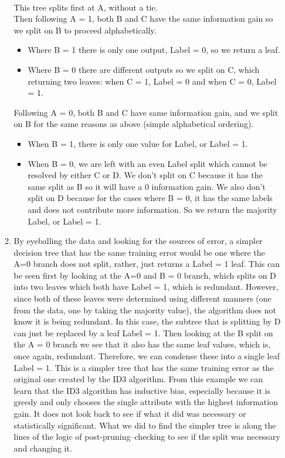 \documentclass[11pt]{article}
\begin{document}
\begin{enumerate}
\begin{enumerate}
	\\This tree splits first at A, without a tie.
	\\ Then following A = 1, both B and C have the same information gain so we split on B to proceed alphabetically. 
	\begin{itemize}
	\item Where B = 1 there is only one output, Label = 0, so we return a leaf.  
	\item Where B = 0 there are different outputs so we split on C, which returning two leaves: when C = 1, Label = 0 and when C = 0, Label = 1. 
	\end{itemize}
	Following A = 0, both B and C have same information gain, and we split on B for the same reasons as above (simple alphabetical ordering). 
	\begin{itemize}
	\item When B = 1, there is only one value for Label, or Label = 1. 
	\item When B = 0, we are left with an even Label split which cannot be resolved by either C or D. We don't split on C because it has the same split as B so it will have a 0 information gain. We also don't split on D because for the cases where B = 0, it has the same labels and does not contribute more information. So we return the majority Label, or Label = 1.
	\end{itemize}
\item By eyeballing the data and looking for the sources of error, a simpler decision tree that has the same training error would be one where the A=0 branch does not split, rather, just returns a Label = 1 leaf. This can be seen first by looking at the A=0 and B = 0 branch, which splits on D into two leaves which both have Label = 1, which is redundant. However, since both of these leaves were determined using different manners (one from the data, one by taking the majority value), the algorithm does not know it is being redundant. In this case, the subtree that is splitting by D can just be replaced by a leaf Label = 1. Then looking at the B split on the A = 0 branch we see that it also has the same leaf values, which is, once again, redundant. Therefore, we can condense these into a single leaf Label = 1. This is a simpler tree that has the same training error as the original one created by the ID3 algorithm. From this example we can learn that the ID3 algorithm has inductive bias, especially because it is greedy and only chooses the single attribute with the highest information gain. It does not look back to see if what it did was necessary or statistically significant. What we did to find the simpler tree is along the lines of the logic of post-pruning--checking to see if the split was necessary and changing it.
\end{enumerate}


\end{enumerate}
\end{document}
